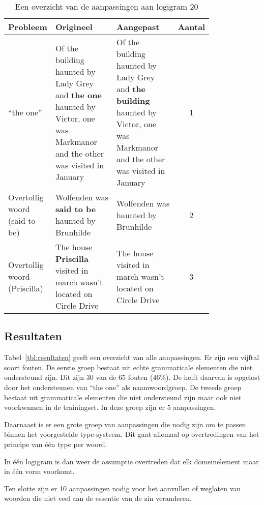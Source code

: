 \begin{table}[h]
  \centering
  \begin{tabular}{p{0.2\linewidth}p{0.3\linewidth}p{0.3\linewidth}c}
    \toprule
    \textbf{Probleem} & \textbf{Origineel} & \textbf{Aangepast} & \textbf{Aantal} \\ 
    \hline
    ``the one'' & Of the building haunted by Lady Grey and \textbf{the one} haunted by Victor, one was Markmanor and the other was visited in January & Of the building haunted by Lady Grey and \textbf{the building} haunted by Victor, one was Markmanor and the other was visited in January & 1 \\
    \hline
    Overtollig woord (said to be) & Wolfenden was \textbf{said to be} haunted by Brunhilde & Wolfenden was haunted by Brunhilde & 2 \\
    \hline
    Overtollig woord (Priscilla) &  The house \textbf{Priscilla} visited in march wasn't located on Circle Drive & The house visited in march wasn't located on Circle Drive & 3 \\
    \bottomrule
  \end{tabular}
  \caption{Een overzicht van de aanpassingen aan logigram 20}
  \label{tbl:log20}
\end{table}

\subsection{Resultaten}
Tabel~\ref{tbl:resultaten} geeft een overzicht van alle aanpassingen. Er zijn een vijftal soort fouten. De eerste groep bestaat uit echte grammaticale elementen die niet ondersteund zijn. Dit zijn 30 van de 65 fouten (46\%). De helft daarvan is opgelost door het ondersteunen van ``the one'' als naamwoordgroep. De tweede groep bestaat uit grammaticale elementen die niet ondersteund zijn maar ook niet voorkwamen in de trainingset. In deze groep zijn er 5 aanpassingen.

Daarnaast is er een grote groep van aanpassingen die nodig zijn om te passen binnen het voorgestelde type-systeem. Dit gaat allemaal op overtredingen van het principe van één type per woord.

In één logigram is dan weer de assumptie overtreden dat elk domeinelement maar in één vorm voorkomt.

Ten slotte zijn er 10 aanpassingen nodig voor het aanvullen of weglaten van woorden die niet veel aan de essentie van de zin veranderen.

